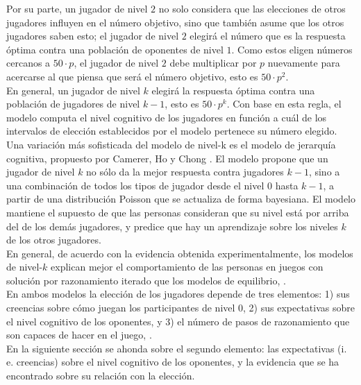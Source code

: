 Por su parte, un jugador de nivel $2$ no solo considera que las elecciones de otros jugadores influyen en el número objetivo, sino que también asume que los otros jugadores saben esto; el jugador de nivel $2$ elegirá el número que es la respuesta óptima contra una población de oponentes de nivel $1$. Como estos eligen números cercanos a $50 \cdot p$, el jugador de nivel $2$ debe multiplicar por $p$ nuevamente para acercarse al que piensa que será el número objetivo, esto es $50 \cdot p^2$.\\

En general, un jugador de nivel $k$ elegirá la respuesta óptima contra una población de jugadores de nivel $k-1$, esto es $50 \cdot p^k$. Con base en esta regla, el modelo  computa el nivel cognitivo de los jugadores en función a cuál de los intervalos de elección establecidos por el modelo pertenece su número elegido.\\

Una variación más sofisticada del modelo de nivel-k es el modelo de jerarquía cognitiva, propuesto por Camerer, Ho y Chong \parencite*{Camerer2004}. El modelo propone que un jugador de nivel $k$ no sólo da la mejor respuesta contra jugadores $k-1$, sino a una combinación de todos los tipos de jugador desde el nivel $0$ hasta $k-1$, a partir de una distribución Poisson que se actualiza de forma bayesiana. El modelo mantiene el supuesto de que las personas consideran que su nivel está por arriba del de los demás jugadores, y predice que hay un aprendizaje sobre los niveles $k$ de los otros jugadores.\\

En general, de acuerdo con la evidencia obtenida experimentalmente, los modelos de nivel-$k$ explican mejor el comportamiento de las personas en juegos con solución por razonamiento iterado que los modelos de equilibrio, \parencite{Crawford2013}.\\

En ambos modelos la elección de los jugadores depende de tres elementos: 1) sus creencias sobre cómo juegan los participantes de nivel $0$, 2) sus expectativas sobre el nivel cognitivo de los oponentes, y 3) el número de pasos de razonamiento que son capaces de hacer en el juego, \parencite{Agranov2012}.\\

En la siguiente sección se ahonda sobre el segundo elemento: las expectativas (i. e. creencias) sobre el nivel cognitivo de los oponentes, y la evidencia que se ha encontrado sobre su relación con la elección.\\

